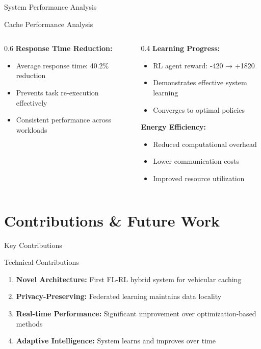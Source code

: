\documentclass[aspectratio=169]{beamer}
\begin{document}
\begin{frame}{System Performance Analysis}
\begin{frame}{Cache Performance Analysis}
\begin{columns}
\begin{column}{0.6\textwidth}
\vspace{0.3cm}
\textbf{Response Time Reduction:}
\begin{itemize}
\item Average response time: 40.2\% reduction
\item Prevents task re-execution effectively
\item Consistent performance across workloads
\end{itemize}
\end{column}
\begin{column}{0.4\textwidth}
\textbf{Learning Progress:}
\begin{itemize}
\item RL agent reward: -420 → +1820
\item Demonstrates effective system learning
\item Converges to optimal policies
\end{itemize}

\vspace{0.3cm}
\textbf{Energy Efficiency:}
\begin{itemize}
\item Reduced computational overhead
\item Lower communication costs
\item Improved resource utilization
\end{itemize}
\end{column}
\end{columns}
\end{frame}

\section{Contributions \& Future Work}

\begin{frame}{Key Contributions}
\begin{block}{Technical Contributions}
\begin{enumerate}
\item \textbf{Novel Architecture:} First FL-RL hybrid system for vehicular caching
\item \textbf{Privacy-Preserving:} Federated learning maintains data locality
\item \textbf{Real-time Performance:} Significant improvement over optimization-based methods
\item \textbf{Adaptive Intelligence:} System learns and improves over time
\end{enumerate}
\end{block}


\end{frame}
\end{frame}
\end{document}
